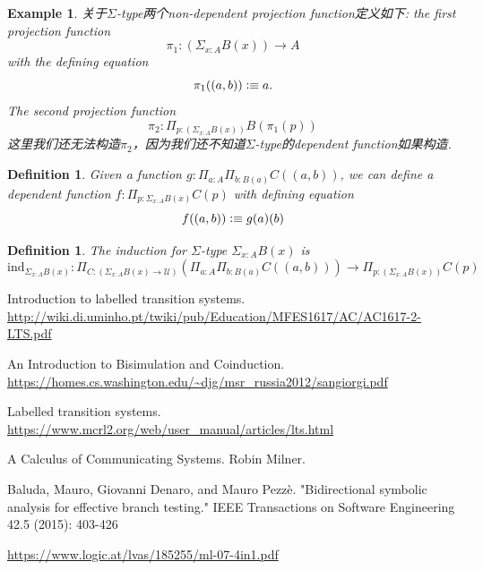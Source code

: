 \documentclass{article}
\newtheorem{example}[theorem]{Example}
\newtheorem{definition}[theorem]{Definition}
\newcommand{\defeqv}{\vcentcolon\equiv}
\begin{document}
\begin{example}
\rm 关于$\Sigma$-type两个non-dependent projection function定义如下: the first projection function
\[
    \pi_1:(\Sigma_{x:A}B(x)) \to A
\]
with the defining equation
\[
    \pi_1((a,b)) \defeqv a.
\]
The second projection function
\[
    \pi_2:\Pi_{p:(\Sigma_{x:A}B(x))} B(\pi_1(p)) 
\]
这里我们还无法构造$\pi_2$，因为我们还不知道$\Sigma$-type的dependent function如果构造.
\end{example}

\begin{definition}
\rm Given a function $g:\Pi_{a:A}\Pi_{b:B(a)} C((a,b))$, we can define a dependent function $f: \Pi_{p:\Sigma_{x:A} B(x)} C(p)$ with defining equation
\[
    f((a,b)) \defeqv g(a)(b)
\]
\end{definition}

\begin{definition}
\rm The induction for $\Sigma$-type $\Sigma_{x:A}B(x)$ is 
\[ 
    \text{ind}_{\Sigma_{x:A}B(x)}: \Pi_{C:(\Sigma_{x:A}B(x) \to \mathcal{U})}(\Pi_{a:A}\Pi_{b:B(a)} C((a,b))) \to \Pi_{p:(\Sigma_{x:A}B(x))} C(p) 
\]
\end{definition}

\newpage
\begin{thebibliography}{9}
Introduction to labelled transition systems. \newline\url{http://wiki.di.uminho.pt/twiki/pub/Education/MFES1617/AC/AC1617-2-LTS.pdf}

An Introduction to Bisimulation and Coinduction. \newline\url{https://homes.cs.washington.edu/~djg/msr_russia2012/sangiorgi.pdf}

Labelled transition systems. \newline\url{https://www.mcrl2.org/web/user_manual/articles/lts.html}


A Calculus of Communicating Systems. Robin Milner. 

Baluda, Mauro, Giovanni Denaro, and Mauro Pezzè. "Bidirectional symbolic analysis for effective branch testing." IEEE Transactions on Software Engineering 42.5 (2015): 403-426

\url{https://www.logic.at/lvas/185255/ml-07-4in1.pdf}
\end{thebibliography}
\end{document}

